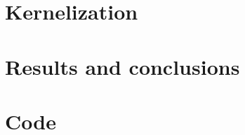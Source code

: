 \documentclass[11pt]{article}
\theoremstyle{definition}
\begin{document}
  \section{Kernelization}

  \section{Results and conclusions}

  \appendix
  \section{Code}
    

  
  
\end{document}
